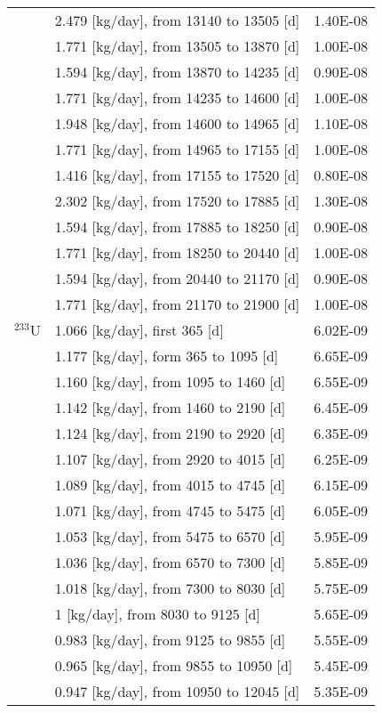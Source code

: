 \begin{longtable}{|p{}|p{}|p{}|}
	&  2.479  [kg/day], from 13140 to 13505 [d]&		1.40E-08	 \\
	&  1.771 [kg/day], from 13505 to 13870 [d]&		1.00E-08	 \\
	& 1.594   [kg/day], from 13870 to 14235 [d]&		0.90E-08	 \\
	&  1.771   [kg/day], from 14235 to 14600 [d]&		1.00E-08	 \\
	& 1.948  [kg/day], from 14600 to 14965 [d]&		1.10E-08	 \\
	&  1.771   [kg/day], from 14965 to 17155 [d]&		1.00E-08	 \\
	&  1.416  [kg/day], from 17155 to 17520 [d]&		0.80E-08	 \\
	&  2.302  [kg/day], from 17520 to 17885 [d]&		1.30E-08	 \\
	& 1.594  [kg/day], from 17885 to 18250 [d]&		0.90E-08	 \\
	&   1.771 [kg/day], from 18250 to 20440 [d]&		1.00E-08	 \\
	&  1.594  [kg/day], from 20440 to 21170 [d]&		0.90E-08	 \\
	&  1.771 [kg/day], from 21170 to 21900 [d]&		1.00E-08	 \\
	\hline
	$^{233}$U &  1.066 [kg/day], first 365 [d]	&   6.02E-09  \\
	& 1.177 [kg/day], form 365 to 1095 [d] &	6.65E-09 \\
	&  1.160 [kg/day], from 1095 to 1460 [d] &	6.55E-09 \\
	& 1.142   [kg/day], from 1460 to 2190 [d] &	6.45E-09 \\
	& 1.124  [kg/day], from 2190 to 2920 [d] &	6.35E-09 \\
	& 1.107 [kg/day], from 2920 to 4015 [d] &	6.25E-09 \\
	&  1.089 [kg/day], from 4015 to 4745 [d] &	6.15E-09 \\
	&  1.071  [kg/day], from 4745 to 5475 [d] &	6.05E-09 \\
	& 1.053  [kg/day], from 5475 to 6570 [d] &	5.95E-09 \\
	&  1.036  [kg/day], from 6570 to 7300 [d] &	5.85E-09 \\
	&  1.018   [kg/day], from 7300 to 8030 [d] &	5.75E-09 \\
	&  1   [kg/day], from 8030 to 9125 [d] &	5.65E-09 \\
	&  0.983 [kg/day], from 9125 to 9855 [d] &	5.55E-09 \\
	&  0.965  [kg/day], from 9855 to 10950 [d] &	5.45E-09 \\
	&   0.947  [kg/day], from 10950 to 12045 [d] &	5.35E-09 \\

\end{longtable}

